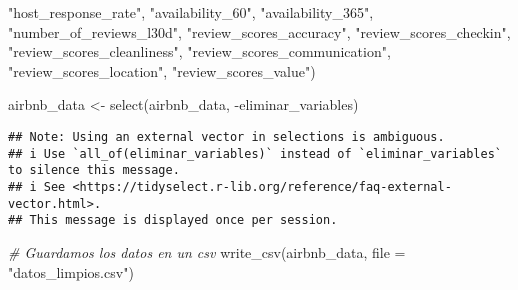 \documentclass[
]{article}
\newenvironment{Shaded}{\begin{snugshade}}{\end{snugshade}}
\newcommand{\AttributeTok}[1]{\textcolor[rgb]{0.77,0.63,0.00}{#1}}
\newcommand{\CommentTok}[1]{\textcolor[rgb]{0.56,0.35,0.01}{\textit{#1}}}
\newcommand{\FunctionTok}[1]{\textcolor[rgb]{0.00,0.00,0.00}{#1}}
\newcommand{\NormalTok}[1]{#1}
\newcommand{\OtherTok}[1]{\textcolor[rgb]{0.56,0.35,0.01}{#1}}
\newcommand{\SpecialCharTok}[1]{\textcolor[rgb]{0.00,0.00,0.00}{#1}}
\newcommand{\StringTok}[1]{\textcolor[rgb]{0.31,0.60,0.02}{#1}}
\begin{document}
\begin{Shaded}
\begin{Highlighting}[]
                        \StringTok{"host\_response\_rate"}\NormalTok{, }\StringTok{"availability\_60"}\NormalTok{, }
                        \StringTok{"availability\_365"}\NormalTok{, }\StringTok{"number\_of\_reviews\_l30d"}\NormalTok{,}
                        \StringTok{"review\_scores\_accuracy"}\NormalTok{, }\StringTok{"review\_scores\_checkin"}\NormalTok{, }
                        \StringTok{"review\_scores\_cleanliness"}\NormalTok{, }\StringTok{"review\_scores\_communication"}\NormalTok{,}
                        \StringTok{"review\_scores\_location"}\NormalTok{, }\StringTok{"review\_scores\_value"}\NormalTok{)}

\NormalTok{airbnb\_data }\OtherTok{\textless{}{-}} \FunctionTok{select}\NormalTok{(airbnb\_data, }\SpecialCharTok{{-}}\NormalTok{eliminar\_variables)}
\end{Highlighting}
\end{Shaded}

\begin{verbatim}
## Note: Using an external vector in selections is ambiguous.
## i Use `all_of(eliminar_variables)` instead of `eliminar_variables` to silence this message.
## i See <https://tidyselect.r-lib.org/reference/faq-external-vector.html>.
## This message is displayed once per session.
\end{verbatim}

\begin{Shaded}
\begin{Highlighting}[]
\CommentTok{\# Guardamos los datos en un csv}
\FunctionTok{write\_csv}\NormalTok{(airbnb\_data, }\AttributeTok{file =} \StringTok{"datos\_limpios.csv"}\NormalTok{)}
\end{Highlighting}
\end{Shaded}
\end{document}
